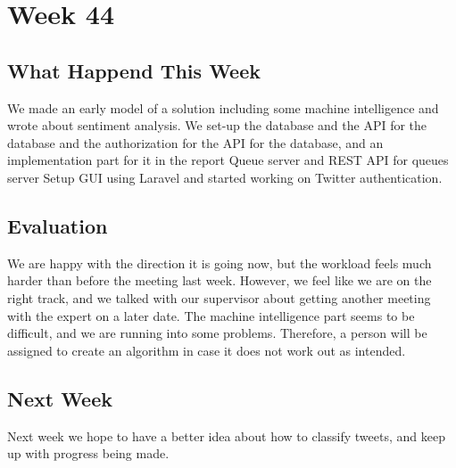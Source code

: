 \section*{Week 44}
\subsection*{What Happend This Week}
We made an early model of a solution including some machine intelligence and
wrote about sentiment analysis. We set-up the database and the \ac{API} for the
database and the authorization for the \ac{API} for the database, and an
implementation part for it in the report Queue server and \ac{REST} \ac{API} for
queues server Setup \ac{GUI} using Laravel and started working on Twitter
authentication.

\subsection*{Evaluation}
We are happy with the direction it is going now, but the workload feels much
harder than before the meeting last week. However, we feel like we are on the
right track, and we talked with our supervisor about getting another meeting
with the expert on a later date. The machine intelligence part seems to be
difficult, and we are running into some problems. Therefore, a person will be
assigned to create an algorithm in case it does not work out as intended.

\subsection*{Next Week} 
Next week we hope to have a better idea about how to classify tweets, and
keep up with progress being made.

